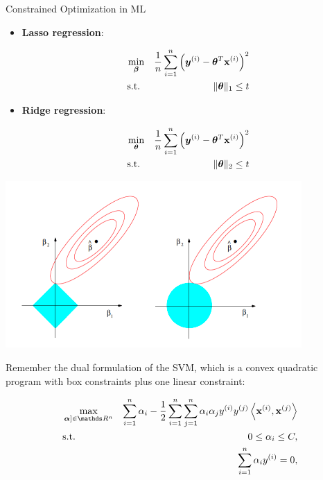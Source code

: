 \begin{vbframe}{Constrained Optimization in ML}

\begin{itemize}
\item \textbf{Lasso regression}:

\begin{eqnarray*}
\min_{\bm{\beta}} && \frac{1}{n}\sum_{i = 1}^n\left(\bm{y}^{(i)} - \bm{\theta}^T\mathbf{x}^{(i)}\right)^2 \\
\text{s.t. } && \|\bm{\theta}\|_1 \le t
\end{eqnarray*}

\item \textbf{Ridge regression}:

\begin{eqnarray*}
\min_{\bm{\theta}} && \frac{1}{n}\sum_{i = 1}^n\left(\bm{y}^{(i)} - \bm{\theta}^T\mathbf{x}^{(i)}\right)^2 \\
\text{s.t. } &&\|\bm{\theta}\|_2 \le t
\end{eqnarray*}
\end{itemize}

\begin{center}
	\includegraphics{figure_man/lasso-ridge.png}
\end{center}

\framebreak

Remember the dual formulation of the SVM, which is a convex quadratic program with box constraints plus one linear constraint: 

\begin{eqnarray*}
	& \max\limits_{\boldsymbol{\alpha}] \in \R^n} & \sum_{i=1}^n \alpha_i - \frac{1}{2}\sum_{i=1}^n\sum_{j=1}^n\alpha_i\alpha_j\yi y^{(j)} \scp{\xi}{\xv^{(j)}} \\
	& \text{s.t. } & 0 \le \alpha_i \le C, \\
	& \quad & \sum_{i=1}^n \alpha_i \yi = 0,
\end{eqnarray*}


\end{vbframe}
